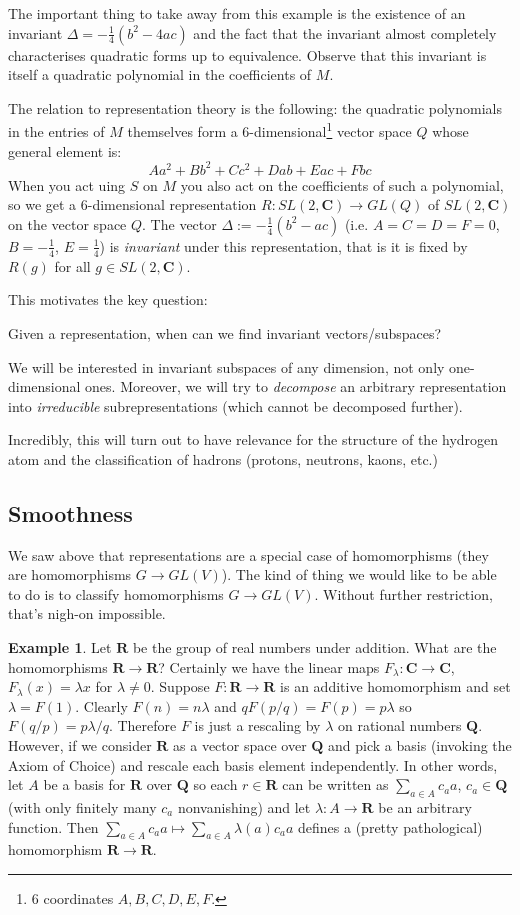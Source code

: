\documentclass[12pt]{article}
\newcommand{\CC}{\mathbf{C}}
\newcommand{\RR}{\mathbf{R}}
\newcommand{\QQ}{\mathbf{Q}}
\theoremstyle{definition}
\newtheorem{exm}[thm]{Example}
\theoremstyle{check}
\theoremstyle{remark}
\theoremstyle{TheoremNum}
\begin{document}
The important thing to take away from this example is the existence of an invariant $\Delta=-\frac{1}{4}(b^2-4ac)$ and the fact that the invariant almost completely characterises quadratic forms up to equivalence. Observe that this invariant is itself a quadratic polynomial in the coefficients of $M$.

The relation to representation theory is the following: the quadratic polynomials in the entries of $M$ themselves form a 6-dimensional\footnote{6 coordinates $A,B,C,D,E,F$.} vector space $Q$ whose general element is:
\[Aa^2+Bb^2+Cc^2+Dab+Eac+Fbc\]
When you act uing $S$ on $M$ you also act on the coefficients of such a polynomial, so we get a 6-dimensional representation $R\colon SL(2,\CC)\to GL(Q)$ of $SL(2,\CC)$ on the vector space $Q$. The vector $\Delta:=-\frac{1}{4}(b^2-ac)$ (i.e. $A=C=D=F=0$, $B=-\frac{1}{4}$, $E=\frac{1}{4}$) is {\em invariant} under this representation, that is it is fixed by $R(g)$ for all $g\in SL(2,\CC)$.

This motivates the key question:

\begin{center}Given a representation, when can we find invariant vectors/subspaces?\end{center}

We will be interested in invariant subspaces of any dimension, not only one-dimensional ones. Moreover, we will try to {\em decompose} an arbitrary representation into {\em irreducible} subrepresentations (which cannot be decomposed further).

Incredibly, this will turn out to have relevance for the structure of the hydrogen atom and the classification of hadrons (protons, neutrons, kaons, etc.)

\subsection{Smoothness}

We saw above that representations are a special case of homomorphisms (they are homomorphisms $G\to GL(V)$). The kind of thing we would like to be able to do is to classify homomorphisms $G\to GL(V)$. Without further restriction, that's nigh-on impossible.

\begin{exm}
Let $\RR$ be the group of real numbers under addition. What are the homomorphisms $\RR\to\RR$? Certainly we have the linear maps $F_{\lambda}\colon\CC\to\CC$, $F_{\lambda}(x)=\lambda x$ for $\lambda\neq 0$. Suppose $F\colon\RR\to\RR$ is an additive homomorphism and set $\lambda=F(1)$. Clearly $F(n)=n\lambda$ and $qF(p/q)=F(p)=p\lambda$ so $F(q/p)=p\lambda/q$. Therefore $F$ is just a rescaling by $\lambda$ on rational numbers $\QQ$. However, if we consider $\RR$ as a vector space over $\QQ$ and pick a basis (invoking the Axiom of Choice) and rescale each basis element independently. In other words, let $A$ be a basis for $\RR$ over $\QQ$ so each $r\in\RR$ can be written as $\sum_{a\in A}c_aa$, $c_a\in\QQ$ (with only finitely many $c_a$ nonvanishing) and let $\lambda\colon A\to\RR$ be an arbitrary function. Then $\sum_{a\in A}c_aa\mapsto\sum_{a\in A}\lambda(a)c_aa$ defines a (pretty pathological) homomorphism $\RR\to\RR$.
\end{exm}
\end{document}

